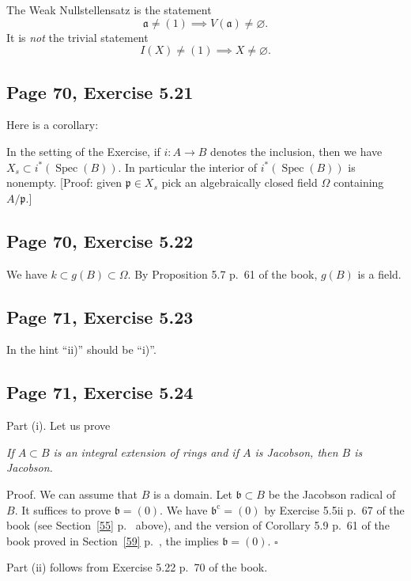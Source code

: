 \documentclass[parskip=half,fontsize=12pt]{scrartcl}%
\newcommand{\oo}{\operatorname}\newcommand{\ooo}{\operatorname*}
\newcommand{\mf}{\mathfrak}
\newcommand{\aaa}{\mf a}
\newcommand{\bbb}{\mf b}
\newcommand{\ppp}{\mf p}
\newcommand{\Spec}{\operatorname{Spec}}\newcommand{\Sp}{\operatorname{Spec}}
\begin{document}
The Weak Nullstellensatz is the statement
$$
\aaa\ne(1)\implies V(\aaa)\ne\varnothing.
$$ 
It is \emph{not} the trivial statement 
$$
I(X)\ne(1)\implies X\ne\varnothing.
$$ 

\subsection{Page 70, Exercise 5.21}\label{522}%

Here is a corollary:

In the setting of the Exercise, if $i:A\to B$ denotes the inclusion, then we have $X_s\subset i^*(\Spec(B))$. In particular the interior of $i^*(\Spec(B))$ is nonempty. [Proof: given $\ppp\in X_s$ pick an algebraically closed field $\Omega$ containing $A/\ppp$.]

\subsection{Page 70, Exercise 5.22}%

We have $k\subset g(B)\subset\Omega$. By Proposition 5.7 p.~61 of the book, $g(B)$ is a field.

\subsection{Page 71, Exercise 5.23}%

In the hint ``ii)'' should be ``i)''.

\subsection{Page 71, Exercise 5.24}%
 
Part (i). Let us prove 

\emph{If $A\subset B$ is an integral extension of rings and if $A$ is Jacobson, then $B$ is Jacobson.}

Proof. We can assume that $B$ is a domain. Let $\bbb\subset B$ be the Jacobson radical of $B$. It suffices to prove $\bbb=(0)$. We have $\bbb^{\oo c}=(0)$ by Exercise 5.5ii p.~67 of the book (see Section~\ref{55} p.~\pageref{55} above), and the version of Corollary 5.9 p.~61 of the book proved in Section~\ref{59} p.~\pageref{59}, the implies $\bbb=(0)$. $\square$

Part (ii) follows from Exercise 5.22 p.~70 of the book.
\end{document}
